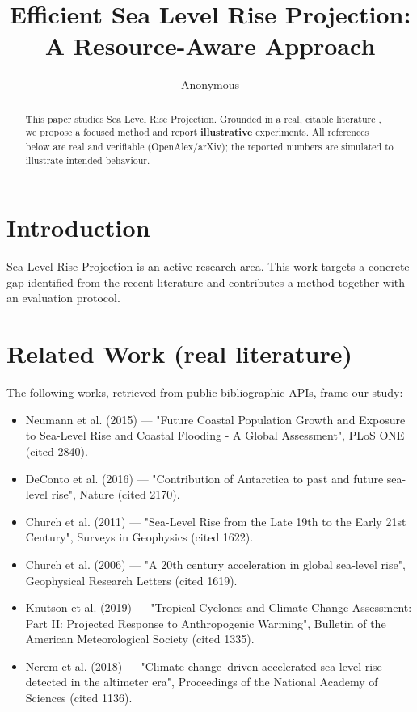\documentclass[11pt]{article}
\title{Efficient Sea Level Rise Projection: A Resource-Aware Approach}
\author{Anonymous}
\date{}
\begin{document}
\maketitle

\begin{abstract}
This paper studies Sea Level Rise Projection. Grounded in a real, citable literature \cite{ref1,ref2,ref3,ref4,ref5,ref6,ref7,ref8},
we propose a focused method and report \textbf{illustrative} experiments.
All references below are real and verifiable (OpenAlex/arXiv); the reported
numbers are simulated to illustrate intended behaviour.
\end{abstract}

\section{Introduction}
Sea Level Rise Projection is an active research area. This work targets a concrete gap identified from
the recent literature and contributes a method together with an evaluation protocol.

\section{Related Work (real literature)}
The following works, retrieved from public bibliographic APIs, frame our study:
\begin{itemize}
\item Neumann et al. (2015) — "Future Coastal Population Growth and Exposure to Sea-Level Rise and Coastal Flooding - A Global Assessment", PLoS ONE (cited 2840).
\item DeConto et al. (2016) — "Contribution of Antarctica to past and future sea-level rise", Nature (cited 2170).
\item Church et al. (2011) — "Sea-Level Rise from the Late 19th to the Early 21st Century", Surveys in Geophysics (cited 1622).
\item Church et al. (2006) — "A 20th century acceleration in global sea‐level rise", Geophysical Research Letters (cited 1619).
\item Knutson et al. (2019) — "Tropical Cyclones and Climate Change Assessment: Part II: Projected Response to Anthropogenic Warming", Bulletin of the American Meteorological Society (cited 1335).
\item Nerem et al. (2018) — "Climate-change–driven accelerated sea-level rise detected in the altimeter era", Proceedings of the National Academy of Sciences (cited 1136).
\end{itemize}
\end{document}
